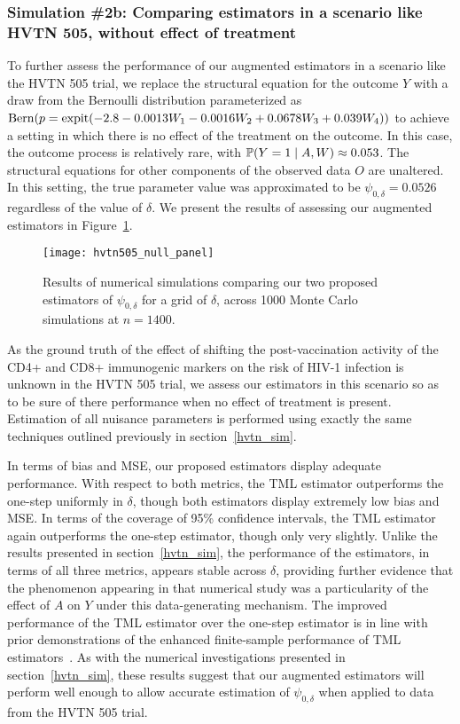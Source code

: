 \subsubsection{Simulation \#2b: Comparing estimators in a scenario like
HVTN 505, without effect of treatment}\label{sim2_supp}

To further assess the performance of our augmented estimators in a scenario like
the HVTN 505 trial, we replace the structural equation for the outcome $Y$ with
a draw from the Bernoulli distribution parameterized as $\operatorname{Bern} (p = \operatorname{expit}(-2.8
- 0.0013 W_1 - 0.0016 W_2 + 0.0678 W_3 + 0.039 W_4))$ to achieve a setting in
which there is no effect of the treatment on the outcome. In this case, the
outcome process is relatively rare, with $\mathbb{P}(Y = 1 \mid A, W) \approx
0.053$. The structural equations for other components of the observed data $O$
are unaltered. In this setting, the true parameter value was approximated to
be $\psi_{0,\delta} = 0.0526$ regardless of the value of $\delta$. We present
the results of assessing our augmented estimators in
Figure~\ref{fig:hvtn_sim_null}.
\begin{figure}[H]
  \centering
  \texttt{[image: hvtn505\_null\_panel]}
  \caption{Results of numerical simulations comparing our two proposed
     estimators of $\psi_{0,\delta}$ for a grid of $\delta$, across 1000 Monte
     Carlo simulations at $n = 1400$.}
 \label{fig:hvtn_sim_null}
\end{figure}

As the ground truth of the effect of shifting the post-vaccination activity of
the CD4+ and CD8+ immunogenic markers on the risk of HIV-1 infection is unknown
in the HVTN 505 trial, we assess our estimators in this scenario so as to be
sure of there performance when no effect of treatment is present. Estimation of
all nuisance parameters is performed using exactly the same techniques outlined
previously in section~\ref{hvtn_sim}.

In terms of bias and MSE, our proposed estimators display adequate performance.
With respect to both metrics, the TML estimator outperforms the one-step
uniformly in $\delta$, though both estimators display extremely low bias and
MSE. In terms of the coverage of 95\% confidence intervals, the TML estimator
again outperforms the one-step estimator, though only very slightly. Unlike the
results presented in section~\ref{hvtn_sim}, the performance of the estimators,
in terms of all three metrics, appears stable across $\delta$, providing further
evidence that the phenomenon appearing in that numerical study was
a particularity of the effect of $A$ on $Y$ under this data-generating
mechanism. The improved performance of the TML estimator over the one-step
estimator is in line with prior demonstrations of the enhanced finite-sample
performance of TML estimators~\citep{vdl2011targeted}. As with the numerical
investigations presented in section~\ref{hvtn_sim}, these results suggest that
our augmented estimators will perform well enough to allow accurate estimation
of $\psi_{0,\delta}$ when applied to data from the HVTN 505 trial.

